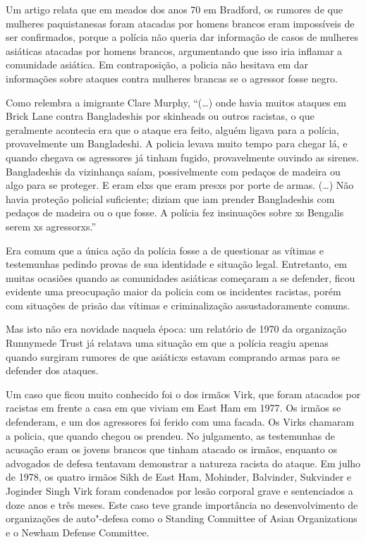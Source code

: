 Um artigo relata que em meados dos anos 70 em Bradford, os rumores de que mulheres paquistanesas foram atacadas por homens brancos eram impossíveis de ser confirmados, porque a polícia não queria dar informação de casos de mulheres asiáticas atacadas por homens brancos, argumentando que isso iria inflamar a comunidade asiática. Em contraposição, a policia não hesitava em dar informações sobre ataques contra mulheres brancas se o agressor fosse negro.


Como relembra a imigrante Clare Murphy, ``(\ldots{}) onde havia muitos ataques em Brick Lane contra Bangladeshis por skinheads ou outros racistas, o que geralmente acontecia era que o ataque era feito, alguém ligava para a polícia, provavelmente um Bangladeshi. A policia levava muito tempo para chegar lá, e quando chegava os agressores já tinham fugido, provavelmente ouvindo as sirenes. Bangladeshis da vizinhança saíam, possivelmente com pedaços de madeira ou algo para se proteger. E eram elxs que eram presxs por porte de armas. (\ldots{}) Não havia proteção policial suficiente; diziam que iam prender Bangladeshis com pedaços de madeira ou o que fosse. A polícia fez insinuações sobre xs Bengalis serem xs agressorxs.''

Era comum que a única ação da polícia fosse a de questionar as vítimas e testemunhas pedindo provas de sua identidade e situação legal. Entretanto, em muitas ocasiões quando as comunidades asiáticas começaram a se defender, ficou evidente uma preocupação maior da policia com os incidentes racistas, porém com situações de prisão das vítimas e criminalização assustadoramente comuns.

 

Mas isto não era novidade naquela época: um relatório de 1970 da organização Runnymede Trust já relatava uma situação em que a polícia reagiu apenas quando surgiram rumores de que asiáticxs estavam comprando armas para se defender dos ataques.

Um caso que ficou muito conhecido foi o dos irmãos Virk, que foram atacados por racistas em frente a casa em que viviam em East Ham em 1977. Os irmãos se defenderam, e um dos agressores foi ferido com uma facada. Os Virks chamaram a policia, que quando chegou os prendeu. No julgamento, as testemunhas de acusação eram os jovens brancos que tinham atacado os irmãos, enquanto os advogados de defesa tentavam demonstrar a natureza racista do ataque. Em julho de 1978, os quatro irmãos Sikh de East Ham, Mohinder, Balvinder, Sukvinder e Joginder Singh Virk foram condenados por lesão corporal grave e sentenciados a doze anos e três meses. Este caso teve grande importância no desenvolvimento de organizações de auto"-defesa como o Standing Committee of Asian Organizations e o Newham Defense Committee.


